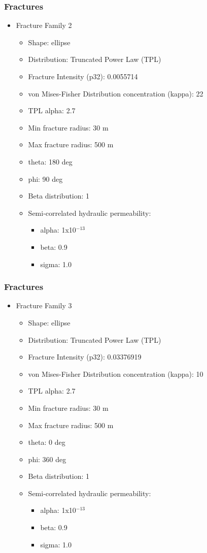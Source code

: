 \documentclass{beamer}
\begin{document}
\begin{frame}\frametitle{Fractures}
	\begin{itemize}
		\item Fracture Family 2
		\begin{itemize}
			\item Shape: ellipse
			\item Distribution: Truncated Power Law (TPL)
			\item Fracture Intensity (p32): 0.0055714
			\item von Mises-Fisher Distribution concentration (kappa): 22
			\item TPL alpha: 2.7
			\item Min fracture radius: 30 m
			\item Max fracture radius: 500 m
			\item theta: 180 deg
			\item phi: 90 deg
			\item Beta distribution: 1
			\item Semi-correlated hydraulic permeability:
			\begin{itemize}
				\item alpha: 1x10$^{-13}$
				\item beta: 0.9
				\item sigma: 1.0
			\end{itemize}
		\end{itemize}
	\end{itemize}
	
\end{frame}	
	
	
\begin{frame}\frametitle{Fractures}
	\begin{itemize}
		\item Fracture Family 3
		\begin{itemize}
			\item Shape: ellipse
			\item Distribution: Truncated Power Law (TPL)
			\item Fracture Intensity (p32): 0.03376919
			\item von Mises-Fisher Distribution concentration (kappa): 10
			\item TPL alpha: 2.7
			\item Min fracture radius: 30 m
			\item Max fracture radius: 500 m
			\item theta: 0 deg
			\item phi: 360 deg
			\item Beta distribution: 1
			\item Semi-correlated hydraulic permeability:
			\begin{itemize}
				\item alpha: 1x10$^{-13}$
				\item beta: 0.9
				\item sigma: 1.0
			\end{itemize}
		\end{itemize}
	\end{itemize}

\end{frame}
	
\end{document}
